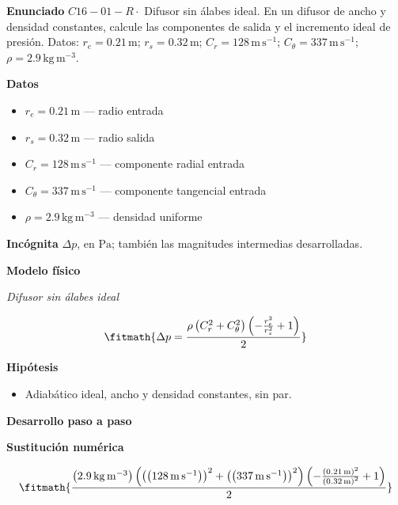 \documentclass[10pt,openany]{book}
\begin{document}
\begin{tcolorbox}[title={Problema resuelto 1}, studiumworked, breakable]

\noindent\textbf{Enunciado}
\(C16-01-R \cdot\) Difusor sin álabes ideal. En un difusor de ancho y densidad constantes, calcule las componentes de salida y el incremento ideal de presión. Datos: \(r_e=0.21\, \mathrm{m}\); \(r_s=0.32\, \mathrm{m}\); \(C_r=128\, \mathrm{m}\,\mathrm{s}^{-1}\); \(C_\theta=337\, \mathrm{m}\,\mathrm{s}^{-1}\); \(\rho=2.9\, \mathrm{kg}\,\mathrm{m}^{-3}\).

\noindent\textbf{Datos}
\begin{itemize}
\item $r_e = 0.21\,\mathrm{m}$ — radio entrada
\item $r_s = 0.32\,\mathrm{m}$ — radio salida
\item $C_r = 128\,\mathrm{m}\,\mathrm{s}^{-1}$ — componente radial entrada
\item $C_\theta = 337\,\mathrm{m}\,\mathrm{s}^{-1}$ — componente tangencial entrada
\item $\rho = 2.9\,\mathrm{kg}\,\mathrm{m}^{-3}$ — densidad uniforme
\end{itemize}

\noindent\textbf{Incógnita}
$\Delta p$, en $\mathrm{Pa}$; también las magnitudes intermedias desarrolladas.

\noindent\textbf{Modelo físico}

\noindent\textit{Difusor sin álabes ideal}

\[
\fitmath{\Delta p=\frac{\rho \left(C_r^{2} + C_\theta^{2}\right) \left(- \frac{r_e^{2}}{r_s^{2}} + 1\right)}{2}}
\]

\noindent\textbf{Hipótesis}
\begin{itemize}
\item Adiabático ideal, ancho y densidad constantes, sin par.
\end{itemize}

\noindent\textbf{Desarrollo paso a paso}



\noindent\textbf{Sustitución numérica}

\[
\fitmath{\frac{\left(2.9\,\mathrm{kg}\,\mathrm{m}^{-3}\right) \left(\left(\left(128\,\mathrm{m}\,\mathrm{s}^{-1}\right)\right)^{2} + \left(\left(337\,\mathrm{m}\,\mathrm{s}^{-1}\right)\right)^{2}\right) \left(- \frac{\left(0.21\,\mathrm{m}\right)^{2}}{\left(0.32\,\mathrm{m}\right)^{2}} + 1\right)}{2}}
\]


\end{tcolorbox}
\end{document}
